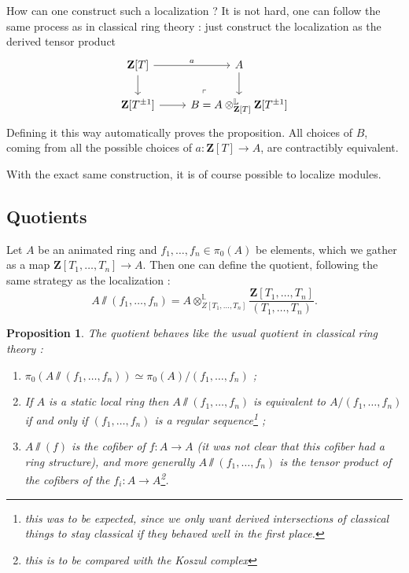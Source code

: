 \documentclass[11pt]{article}
\newtheorem{proposition}[theorem]{Proposition}
\theoremstyle{definition}
\renewcommand{\L}{\mathbb{L}}
\newcommand{\Z}{\mathbf{Z}}
\begin{document}
How can one construct such a localization ?
It is not hard, one can follow the same process as in classical ring theory : just construct the localization as the derived tensor product
\[\begin{tikzcd}
	{\Z[T]} & A \\
	{\Z[T^{\pm 1}]} & {B = A \otimes_{\Z[T]}^{\L} \Z[T^{\pm 1}]}
	\arrow["a", from=1-1, to=1-2]
	\arrow[from=1-1, to=2-1]
	\arrow[from=1-2, to=2-2]
	\arrow[from=2-1, to=2-2]
	\arrow["\lrcorner"{anchor=center, pos=0.125, rotate=180}, draw=none, from=2-2, to=1-1]
\end{tikzcd}\]
Defining it this way automatically proves the proposition.
All choices of $B$, coming from all the possible choices of $a : \Z[T] \to A$, are contractibly equivalent.

With the exact same construction, it is of course possible to localize modules.

\subsection{Quotients}
Let $A$ be an animated ring and $f_1, \dots, f_n \in \pi_0(A)$ be elements, which we gather as a map $\Z[T_1, \dots, T_n] \to A$.
Then one can define the quotient, following the same strategy as the localization :
\[
    A\sslash(f_1, \dots, f_n) = A \otimes_{Z[T_1, \dots, T_n]}^{\L} \frac{\Z[T_1, \dots, T_n]}{(T_1, \dots, T_n)}.
\]

\begin{proposition}
    The quotient behaves like the usual quotient in classical ring theory :
    \begin{enumerate}
        \item $\pi_0(A\sslash(f_1, \dots, f_n)) \simeq \pi_0(A)/(f_1, \dots, f_n)$ ;
        \item If $A$ is a static local ring then $A\sslash(f_1, \dots, f_n)$ is equivalent to $A/(f_1, \dots, f_n)$ \emph{if and only if} $(f_1, \dots, f_n)$ is a regular sequence\footnote{this was to be expected, since we only want derived intersections of classical things to stay classical if they behaved well in the first place.} ;
        \item $A\sslash(f)$ is the cofiber of $f : A \to A$ (it was not clear that this cofiber had a ring structure), and more generally $A\sslash(f_1, \dots, f_n)$ is the tensor product of the cofibers of the $f_i : A \to A$\footnote{this is to be compared with the Koszul complex}.
    \end{enumerate}
\end{proposition}
\end{document}

